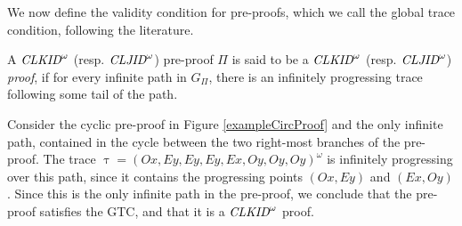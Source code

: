 We now define the validity condition for pre-proofs, which we call the global trace condition, following the literature.

\begin{definition}
    \label{def:GTC}
    A $\textit{CLKID}^\omega$ (resp. $\textit{CLJID}^\omega$) pre-proof $\Pi$ is said to be a $\textit{CLKID}^\omega$ (resp. $\textit{CLJID}^\omega$) \emph{proof}, if for every infinite path in $G_{\Pi}$, there is an infinitely progressing trace following some tail of the path.
\end{definition}

\begin{example}
    Consider the cyclic pre-proof in Figure \ref{exampleCircProof} and the only infinite path, contained in the cycle between the two right-most branches of the pre-proof. The trace $\uptau = (Ox, Ey, Ey, Ey, Ex, Oy, Oy, Oy)^{\omega}$  is infinitely progressing over this path, since it contains the progressing points $(Ox,Ey)$ and $(Ex,Oy)$. Since this is the only infinite path in the pre-proof, we conclude that the pre-proof satisfies the GTC, and
    that it is a $\textit{CLKID}^\omega$ proof.
\end{example}

